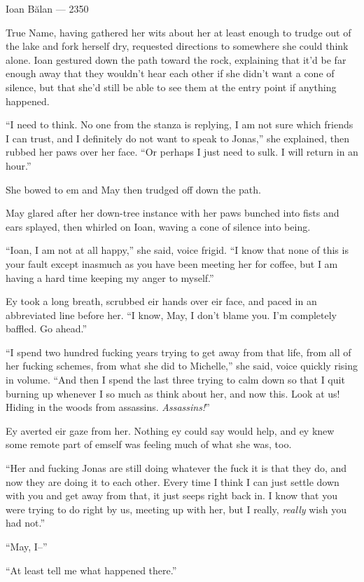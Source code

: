 Ioan Bălan — 2350

True Name, having gathered her wits about her at least enough to trudge out of the lake and fork herself dry, requested directions to somewhere she could think alone. Ioan gestured down the path toward the rock, explaining that it'd be far enough away that they wouldn't hear each other if she didn't want a cone of silence, but that she'd still be able to see them at the entry point if anything happened.

``I need to think. No one from the stanza is replying, I am not sure which friends I can trust, and I definitely do not want to speak to Jonas,'' she explained, then rubbed her paws over her face. ``Or perhaps I just need to sulk. I will return in an hour.''

She bowed to em and May then trudged off down the path.

May glared after her down-tree instance with her paws bunched into fists and ears splayed, then whirled on Ioan, waving a cone of silence into being.

``Ioan, I am not at all happy,'' she said, voice frigid. ``I know that none of this is your fault except inasmuch as you have been meeting her for coffee, but I am having a hard time keeping my anger to myself.''

Ey took a long breath, scrubbed eir hands over eir face, and paced in an abbreviated line before her. ``I know, May, I don't blame you. I'm completely baffled. Go ahead.''

``I spend two hundred fucking years trying to get away from that life, from all of her fucking schemes, from what she did to Michelle,'' she said, voice quickly rising in volume. ``And then I spend the last three trying to calm down so that I quit burning up whenever I so much as think about her, and now this. Look at us! Hiding in the woods from assassins. \emph{Assassins!}''

Ey averted eir gaze from her. Nothing ey could say would help, and ey knew some remote part of emself was feeling much of what she was, too.

``Her and fucking Jonas are still doing whatever the fuck it is that they do, and now they are doing it to each other. Every time I think I can just settle down with you and get away from that, it just seeps right back in. I know that you were trying to do right by us, meeting up with her, but I really, \emph{really} wish you had not.''

``May, I--''

``At least tell me what happened there.''

